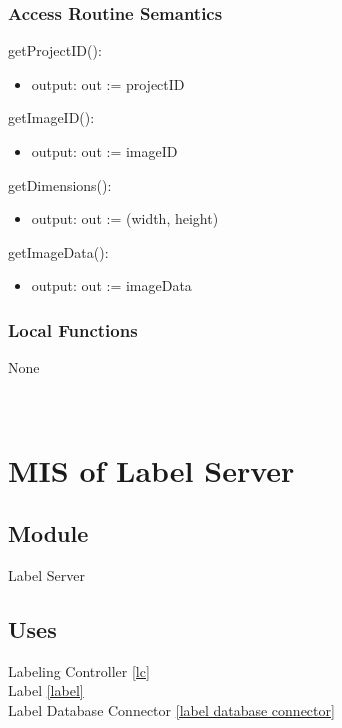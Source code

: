 \documentclass[12pt, titlepage]{article}
\begin{document}
\subsubsection{Access Routine Semantics}

\noindent getProjectID():
\begin{itemize}
\item output: out := projectID
\end{itemize}

\noindent getImageID():
\begin{itemize}
\item output: out := imageID
\end{itemize}

\noindent getDimensions():
\begin{itemize}
\item output: out := (width, height)
\end{itemize}

\noindent getImageData():
\begin{itemize}
\item output: out := imageData
\end{itemize}

\subsubsection{Local Functions}
None


\newpage
  ~\newpage
  
  \section{MIS of Label Server}\label{LabelServer}
  
  
  
  \subsection{Module}
  
  Label Server
  
  \subsection{Uses}
  
  Labeling Controller \ref{lc}\\
  Label \ref{label}\\ 
  Label Database Connector \ref{label database connector}
  
\end{document}
